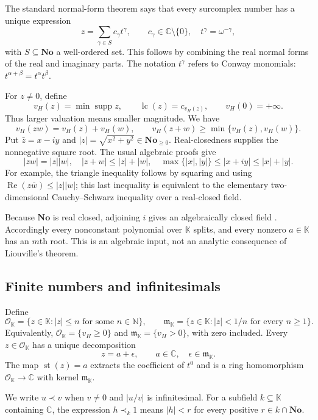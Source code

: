 \documentclass[11pt,a4paper]{article}
\theoremstyle{definition}\newtheorem{definition}[theorem]{Definition}
\theoremstyle{remark}\newtheorem{remark}[theorem]{Remark}
\newcommand{\No}{\mathbf{No}}
\newcommand{\K}{\mathbb K}
\newcommand{\C}{\mathbb C}\newcommand{\R}{\mathbb R}\newcommand{\N}{\mathbb N}\newcommand{\Z}{\mathbb Z}
\newcommand{\fin}{\mathcal O_{\K}}\newcommand{\infinit}{\mathfrak m_{\K}}
\newcommand{\st}{\operatorname{st}}\newcommand{\supp}{\operatorname{supp}}
\newcommand{\lc}{\operatorname{lc}}\newcommand{\id}{\operatorname{id}}
\newcommand{\vH}{v_H}
\numberwithin{equation}{section}
\begin{document}
The standard normal-form theorem says that every surcomplex number has a unique expression
\begin{equation}\label{eq:normal}
 z=\sum_{\gamma\in S}c_\gamma t^\gamma,
 \qquad c_\gamma\in\C\setminus\{0\},
 \quad t^\gamma=\omega^{-\gamma},
\end{equation}
with $S\subseteq\No$ a well-ordered set. This follows by combining the real normal forms of the real and imaginary parts. The notation $t^\gamma$ refers to Conway monomials: $t^{\alpha+\beta}=t^\alpha t^\beta$.

For $z\ne0$, define
\[
 \vH(z)=\min\supp z,\qquad
 \lc(z)=c_{\vH(z)},\qquad \vH(0)=+\infty.
\]
Thus larger valuation means smaller magnitude. We have
\[
 \vH(zw)=\vH(z)+\vH(w),\qquad
 \vH(z+w)\geq\min\{\vH(z),\vH(w)\}.
\]
Put $\bar z=x-iy$ and $|z|=\sqrt{x^2+y^2}\in\No_{\geq0}$. Real-closedness supplies the nonnegative square root. The usual algebraic proofs give
\[
 |zw|=|z||w|,\quad |z+w|\leq |z|+|w|,\quad
 \max\{|x|,|y|\}\leq|x+iy|\leq |x|+|y|.
\]
For example, the triangle inequality follows by squaring and using
$\operatorname{Re}(z\bar w)\leq|z||w|$; this last inequality is equivalent to the elementary two-dimensional Cauchy--Schwarz inequality over a real-closed field.

Because $\No$ is real closed, adjoining $i$ gives an algebraically closed field \cite{Conway,Gonshor}. Accordingly every nonconstant polynomial over $\K$ splits, and every nonzero $a\in\K$ has an $m$th root. This is an algebraic input, not an analytic consequence of Liouville's theorem.

\subsection{Finite numbers and infinitesimals}
Define
\[
 \fin=\{z\in\K:|z|\leq n\text{ for some }n\in\N\},\qquad
 \infinit=\{z\in\K:|z|<1/n\text{ for every }n\geq1\}.
\]
Equivalently, $\fin=\{\vH\geq0\}$ and $\infinit=\{\vH>0\}$, with zero included. Every $z\in\fin$ has a unique decomposition
\begin{equation}\label{eq:st}
 z=a+\epsilon,\qquad a\in\C,\quad\epsilon\in\infinit.
\end{equation}
The map $\st(z)=a$ extracts the coefficient of $t^0$ and is a ring homomorphism $\fin\to\C$ with kernel $\infinit$.

We write $u\prec v$ when $v\ne0$ and $|u/v|$ is infinitesimal. For a subfield $k\subseteq\K$ containing $\C$, the expression $h\prec_k1$ means $|h|<r$ for every positive $r\in k\cap\No$.
\end{document}

